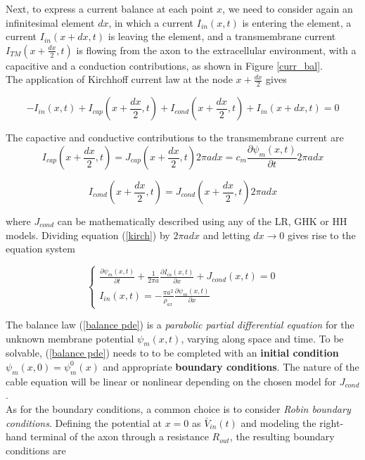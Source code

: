\documentclass[12pt, a4paper]{article}
\begin{document}
Next, to express a current balance at each point $x$, we need to consider again an infinitesimal element $dx$, in which a current $I_{in}(x,t)$ is entering the element, a current $I_{in}(x+dx,t)$ is leaving the element, and a transmembrane current $I_{TM}(x+\frac{dx}{2},t)$ is flowing from the axon to the extracellular environment, with a capacitive and a conduction contributions, as shown in Figure \ref*{curr_bal}.\\
The application of Kirchhoff current law at the node  $x+\frac{dx}{2}$ gives

\begin{equation}
- I_{in}(x,t) + I_{cap}(x+\frac{dx}{2},t) + I_{cond}(x+\frac{dx}{2},t) + I_{in}(x+dx,t) = 0 \label{kirch}
\end{equation}

The capactive and conductive contributions to the transmembrane current are
\begin{equation}
I_{cap}(x+\frac{dx}{2},t) = J_{cap}(x+\frac{dx}{2},t) 2 \pi a dx = c_m \frac{\partial \psi_m(x,t)}{\partial t} 2 \pi a dx 
\end{equation}

\begin{equation}
I_{cond}(x+\frac{dx}{2},t) = J_{cond}(x+\frac{dx}{2},t) 2 \pi a dx 
\end{equation}

where $J_{cond}$ can be mathematically described using any of the LR, GHK or HH models. Dividing equation (\ref{kirch})  by $2 \pi a dx $ and letting $dx \rightarrow 0$ gives rise to the equation system

\begin{equation}
\begin{cases}
\frac{\partial \psi_m(x,t)}{\partial t} + \frac{1}{2 \pi a }\frac{\partial I_{in}(x,t)}{\partial x} + J_{cond}(x,t) = 0 \\
I_{in}(x,t) = -\frac{\pi a^2}{\rho_{ax}}\frac{\partial \psi_m(x,t)}{\partial x}
\end{cases} \label{balance pde}
\end{equation}

The balance law (\ref*{balance pde}) is a \textit{parabolic partial differential equation} for the unknown membrane potential $\psi_m(x,t) $, varying along space and time. To be solvable, (\ref*{balance pde}) needs to to be completed with an \textbf{initial condition} $ \psi_m (x,0) = \psi_m^0(x)$ and appropriate \textbf{boundary conditions}. The nature of the cable equation will be linear or nonlinear depending on the chosen model for $J_{cond}$.\\
As for the boundary conditions, a common choice is to consider \textit{Robin boundary conditions}. Defining the potential at $x=0$ as $\bar{V}_{in}(t)$ and modeling the right-hand terminal of the axon through a resistance $R_{out}$, the resulting boundary conditions are
\end{document}
